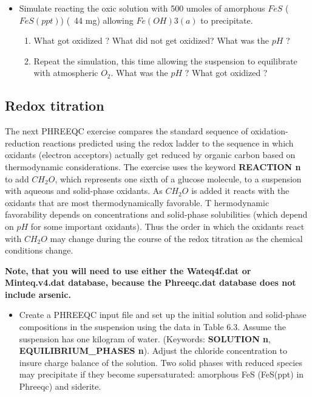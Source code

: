 \begin{itemize}
\begin{enumerate}
	\end{enumerate} 
\item Simulate reacting the oxic solution with 500 umoles of amorphous $FeS$ ($FeS(ppt)$) (~44 mg) allowing $Fe(OH)3(a)$ to precipitate. 
	\begin{enumerate}  
	\item What got oxidized ? What did not get oxidized? What was the $pH$ ?
	\item Repeat the simulation, this time allowing the suspension to equilibrate with atmospheric $O_2$. What was the $pH$ ? What got oxidized ?
	\end{enumerate}  
\end{itemize} 

\subsection[Redox titration]{Redox titration}

The next PHREEQC exercise compares the standard sequence of oxidation-reduction reactions 
predicted using the redox ladder to the sequence in which oxidants (electron acceptors) 
actually get reduced by organic carbon based on thermodynamic considerations.   
The exercise uses the keyword {\color{red} \textbf{REACTION n}} to add $CH_2O$, 
which represents one sixth of a glucose molecule, to a suspension with aqueous and solid-phase oxidants.  
As $CH_2O$ is added it reacts with the oxidants that are most thermodynamically favorable. T
hermodynamic favorability depends on concentrations and solid-phase solubilities 
(which depend on $pH$ for some important oxidants).  
Thus the order in which the oxidants react with $CH_2O$ may change during the course 
of the redox titration as the chemical conditions change.  

\textbf{Note, that you will need to use either the {\color{red} \textbf{Wateq4f.dat}} 
or {\color{red} \textbf{Minteq.v4.dat}} database, 
because the Phreeqc.dat database does not include arsenic.}


\begin{itemize}
\item Create a PHREEQC input file and set up the initial solution and solid-phase compositions 
in the suspension using the data in Table 6.3.  
Assume the suspension has one kilogram of water.  
(Keywords: {\color{red} \textbf{SOLUTION n}}, {\color{red} \textbf{EQUILIBRIUM_PHASES n}}).  
Adjust the chloride concentration to insure charge balance of the solution. 
Two solid phases with reduced species may precipitate if they become supersaturated: 
amorphous FeS (FeS(ppt) in Phreeqc) and siderite.
\end{itemize}















